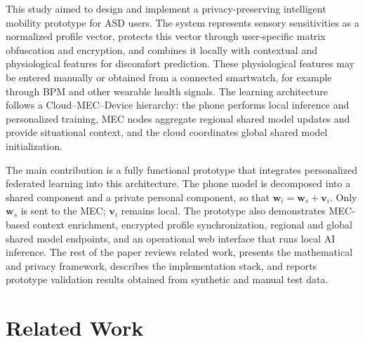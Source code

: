 \documentclass[lettersize,journal]{IEEEtran}
\begin{document}
This study aimed to design and implement a privacy-preserving
intelligent mobility prototype for ASD users. The system represents
sensory sensitivities as a normalized profile vector, protects this
vector through user-specific matrix obfuscation and encryption, and
combines it locally with contextual and physiological features for
discomfort prediction. These physiological features may be entered
manually or obtained from a connected smartwatch, for example through
BPM and other wearable health signals. The learning architecture follows a
Cloud--MEC--Device hierarchy: the phone performs local inference and
personalized training, MEC nodes aggregate regional shared model
updates and provide situational context, and the cloud coordinates
global shared model initialization.

The main contribution is a fully functional prototype that integrates
personalized federated learning into this architecture. The phone model
is decomposed into a shared component and a private personal component,
so that $\mathbf{w}_i=\mathbf{w}_s+\mathbf{v}_i$. Only
$\mathbf{w}_s$ is sent to the MEC; $\mathbf{v}_i$ remains local. The
prototype also demonstrates MEC-based context enrichment, encrypted
profile synchronization, regional and global shared model endpoints,
and an operational web interface that runs local AI inference. The rest
of the paper reviews related work, presents the mathematical and
privacy framework, describes the implementation stack, and reports
prototype validation results obtained from synthetic and manual test
data.

\section{Related Work}
\label{sec:background}
\end{document}
